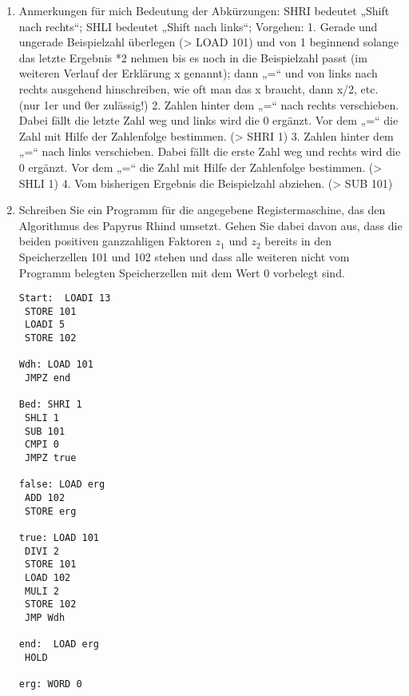 \documentclass{lehramt-informatik-aufgabe}
\begin{document}
\begin{enumerate}
\item Anmerkungen für mich
Bedeutung der Abkürzungen:
SHRI bedeutet „Shift nach rechts“; SHLI bedeutet „Shift nach links“;
Vorgehen:
1. Gerade und ungerade Beispielzahl überlegen (> LOAD 101) und von 1 beginnend solange das letzte Ergebnis *2 nehmen bis es noch in die Beispielzahl passt (im weiteren Verlauf der Erklärung x genannt); dann „=“ und von links nach rechts ausgehend hinschreiben, wie oft man das x braucht, dann x/2, etc. (nur 1er und 0er zulässig!)
2. Zahlen hinter dem „=“ nach rechts verschieben. Dabei fällt die letzte Zahl weg und links wird die 0 ergänzt. Vor dem „=“ die Zahl mit Hilfe der Zahlenfolge bestimmen. (> SHRI 1)
3. Zahlen hinter dem „=“ nach links verschieben. Dabei fällt die erste Zahl weg und rechts wird die 0 ergänzt. Vor dem „=“ die Zahl mit Hilfe der Zahlenfolge bestimmen. (> SHLI 1)
4. Vom bisherigen Ergebnis die Beispielzahl abziehen. (> SUB 101)

\item Schreiben Sie ein Programm für die angegebene Registermaschine,
das den Algorithmus des Papyrus Rhind umsetzt. Gehen Sie dabei davon
aus, dass die beiden positiven ganzzahligen Faktoren $z_1$ und $z_2$
bereits in den Speicherzellen 101 und 102 stehen und dass alle weiteren
nicht vom Programm belegten Speicherzellen mit dem Wert 0 vorbelegt
sind.

\begin{verbatim}
Start:  LOADI 13
 STORE 101
 LOADI 5
 STORE 102

Wdh: LOAD 101
 JMPZ end

Bed: SHRI 1
 SHLI 1
 SUB 101
 CMPI 0
 JMPZ true

false: LOAD erg
 ADD 102
 STORE erg

true: LOAD 101
 DIVI 2
 STORE 101
 LOAD 102
 MULI 2
 STORE 102
 JMP Wdh

end:  LOAD erg
 HOLD

erg: WORD 0
\end{verbatim}

\end{enumerate}
\end{document}
